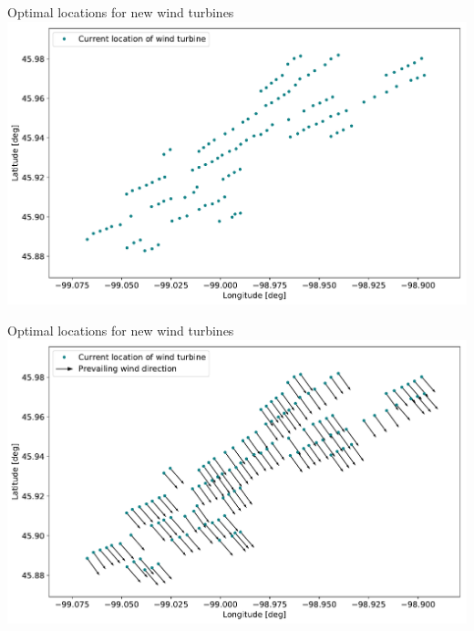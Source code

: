 \documentclass[color=usenames,dvipsnames]{beamer}
\begin{document}


    \begin{frame}{Optimal locations for new wind turbines}
        \includegraphics[width=\textwidth]{../../figures/optimized_cluster-0.pdf}
    \end{frame}

    \begin{frame}{Optimal locations for new wind turbines}
        \includegraphics[width=\textwidth]{../../figures/optimized_cluster-1.pdf}
    \end{frame}
\end{document}
